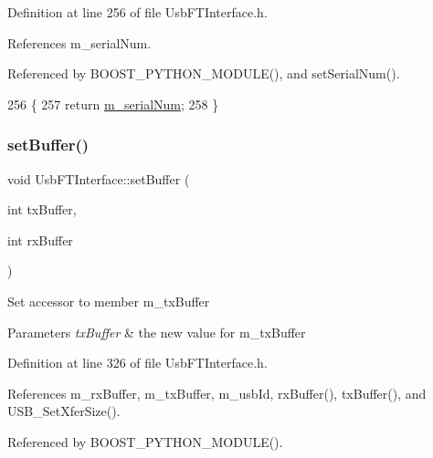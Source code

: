 Definition at line 256 of file Usb\+F\+T\+Interface.\+h.



References m\+\_\+serial\+Num.



Referenced by B\+O\+O\+S\+T\+\_\+\+P\+Y\+T\+H\+O\+N\+\_\+\+M\+O\+D\+U\+L\+E(), and set\+Serial\+Num().


\begin{DoxyCode}
256                          \{
257     \textcolor{keywordflow}{return} \hyperlink{classUsbFTInterface_a031610ca38939734ec7431d80f5f299f}{m\_serialNum};
258   \}
\end{DoxyCode}
\mbox{\label{classUsbFTInterface_aaa09fdc28deb45d0a65f5d42c06dd659}} 
\subsubsection{\texorpdfstring{set\+Buffer()}{setBuffer()}}
{\footnotesize\ttfamily void Usb\+F\+T\+Interface\+::set\+Buffer (\begin{DoxyParamCaption}\item[{int}]{tx\+Buffer,  }\item[{int}]{rx\+Buffer }\end{DoxyParamCaption})\hspace{0.3cm}{\ttfamily [inline]}}

Set accessor to member m\+\_\+tx\+Buffer 
\begin{DoxyParams}{Parameters}
{\em tx\+Buffer} & the new value for m\+\_\+tx\+Buffer \\
\hline
\end{DoxyParams}


Definition at line 326 of file Usb\+F\+T\+Interface.\+h.



References m\+\_\+rx\+Buffer, m\+\_\+tx\+Buffer, m\+\_\+usb\+Id, rx\+Buffer(), tx\+Buffer(), and U\+S\+B\+\_\+\+Set\+Xfer\+Size().



Referenced by B\+O\+O\+S\+T\+\_\+\+P\+Y\+T\+H\+O\+N\+\_\+\+M\+O\+D\+U\+L\+E().


